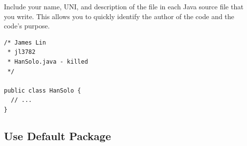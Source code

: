 \documentclass[10pt,DIV=23,landscape]{scrartcl}
\begin{document}
\begin{paracol}{2}
\begin{leftcolumn}
Include your name, UNI, and description of the file in each Java source
file that you write. This allows you to quickly identify the author of
the code and the code's purpose.
\end{leftcolumn}

\begin{rightcolumn}
\begin{lstlisting}
/* James Lin
 * jl3782
 * HanSolo.java - killed
 */

public class HanSolo {
  // ...
}
\end{lstlisting}
\end{rightcolumn}
\end{paracol}

\subsection{Use Default Package}\label{use-default-package}
\end{document}
